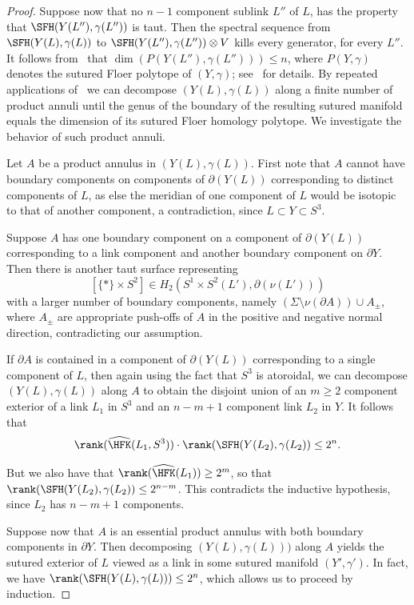 \documentclass{amsart}
\theoremstyle{definition}
\theoremstyle{remark}
\numberwithin{equation}{section}
\begin{document}
\begin{proof}
   Suppose now that no $n-1$ component sublink $L''$ of $L$,  has the property that $\SFH(Y(L''),\gamma(L''))$ is taut. Then the spectral sequence from $\SFH(Y(L),\gamma(L))$ to $\SFH(Y(L''),\gamma(L''))\otimes V$ kills every generator, for every $L''$. It follows from~\cite[Corollary 5.27]{binns2024floer} that $\dim(P(Y(L''),\gamma(L'')))\leq n$, where $P(Y,\gamma)$ denotes the sutured Floer polytope of $(Y,\gamma)$; see~\cite{juhasz2010sutured} for details.
    By repeated applications of~\cite[Lemma 2.17]{binns2024floer} we can decompose $(Y(L),\gamma(L))$ along a finite number of product annuli until the genus of the boundary of the resulting sutured manifold equals the dimension of its sutured Floer homology polytope. We investigate the behavior of such product annuli.

    Let $A$ be a product annulus in $(Y(L),\gamma(L))$. First note that $A$ cannot have boundary components on components of $\partial (Y(L))$ corresponding to distinct components of $L$, as else the meridian of one component of $L$ would be isotopic to that of another component, a contradiction, since $L\subset Y\subset S^3$.

    Suppose $A$ has one boundary component on a component of $\partial(Y(L))$ corresponding to a link component and another boundary component on $\partial Y$. Then there is another taut surface representing $${[\{*\}\times S^2]\in H_2(S^1\times S^2(L'),\partial(\nu(L')))}$$ with a larger number of boundary components, namely $(\Sigma\setminus \nu(\partial A))\cup A_\pm$, where $A_\pm$ are appropriate push-offs of $A$ in the positive and negative normal direction, contradicting our assumption.

If $\partial A$ is contained in a component of $\partial(Y(L))$ corresponding to a single component of $L$, then again using the fact that $S^3$ is atoroidal, we can decompose $(Y(L),\gamma(L))$ along $A$ to obtain the disjoint union of an $m\geq 2$ component exterior of a link $L_1$ in $S^3$ and an $n-m+1$ component link $L_2$ in $Y$. It follows that \begin{align*}
    \rank(\widehat{\HFK}(L_1,S^3))\cdot\rank(\SFH(Y(L_2),\gamma(L_2))\leq 2^n.
\end{align*}

But we also have that  $\rank(\widehat{\HFK}(L_1))\geq 2^m$, so that ${\rank(\SFH(Y(L_2),\gamma(L_2))\leq 2^{n-m}}$. This contradicts the inductive hypothesis, since $L_2$ has $n-m+1$ components.

Suppose now that $A$ is an essential product annulus with both boundary components in $\partial Y$. Then decomposing $(Y(L),\gamma(L)))$ along $A$ yields the sutured exterior of $L$ viewed as a link in some sutured manifold $(Y',\gamma')$. In fact, we have $\rank(\SFH(Y(L),\gamma(L)))\leq 2^n$, which allows us to proceed by induction.
 


\end{proof}
\end{document}
